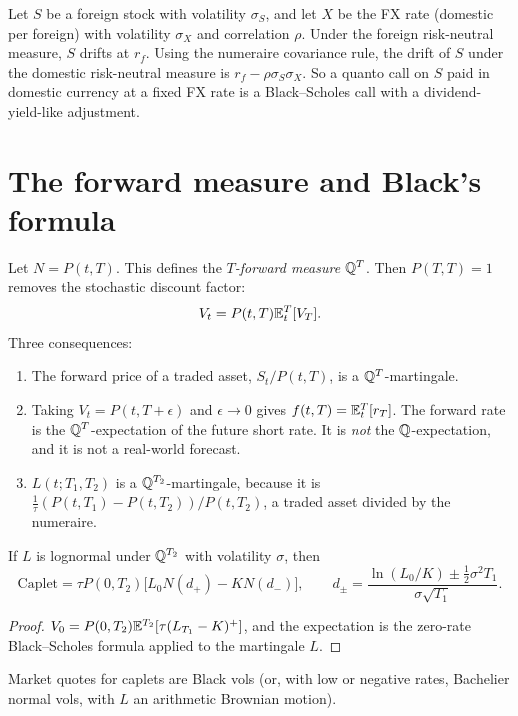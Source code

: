 \begin{example}
Let $S$ be a foreign stock with volatility $\sigma_S$, and let $X$ be the FX rate (domestic per foreign) with volatility $\sigma_X$ and correlation $\rho$. Under the foreign risk-neutral measure, $S$ drifts at $r_f$. Using the numeraire covariance rule, the drift of $S$ under the domestic risk-neutral measure is $r_f-\rho\sigma_S\sigma_X$. So a quanto call on $S$ paid in domestic currency at a fixed FX rate is a Black--Scholes call with a dividend-yield-like adjustment.
\end{example}

\section{The forward measure and Black's formula}

Let $N=P(t,T)$. This defines the \emph{$T$-forward measure} $\mathbb{Q}^T$. Then $P(T,T)=1$ removes the stochastic discount factor:
\[
V_t=P(t,T)\mathbb{E}^{T}_t[V_T].
\]
Three consequences:
\begin{enumerate}
\item The forward price of a traded asset, $S_t/P(t,T)$, is a $\mathbb{Q}^T$-martingale.
\item Taking $V_t=P(t,T+\epsilon)$ and $\epsilon\to0$ gives $f(t,T)=\mathbb{E}^T_t[r_T]$. The forward rate is the $\mathbb{Q}^T$-expectation of the future short rate. It is \emph{not} the $\mathbb{Q}$-expectation, and it is not a real-world forecast.
\item $L(t;T_1,T_2)$ is a $\mathbb{Q}^{T_2}$-martingale, because it is $\frac1\tau(P(t,T_1)-P(t,T_2))/P(t,T_2)$, a traded asset divided by the numeraire.
\end{enumerate}

\begin{theorem}\label{thm:blackcaplet}
If $L$ is lognormal under $\mathbb{Q}^{T_2}$ with volatility $\sigma$, then
\[
\text{Caplet}=\tau P(0,T_2)\bigl[L_0N(d_+)-KN(d_-)\bigr],\qquad d_\pm=\frac{\ln(L_0/K)\pm\frac12\sigma^2T_1}{\sigma\sqrt{T_1}}.
\]
\end{theorem}

\begin{proof}
$V_0=P(0,T_2)\mathbb{E}^{T_2}[\tau(L_{T_1}-K)^+]$, and the expectation is the zero-rate Black--Scholes formula applied to the martingale $L$.
\end{proof}

Market quotes for caplets are Black vols (or, with low or negative rates, Bachelier normal vols, with $L$ an arithmetic Brownian motion).

